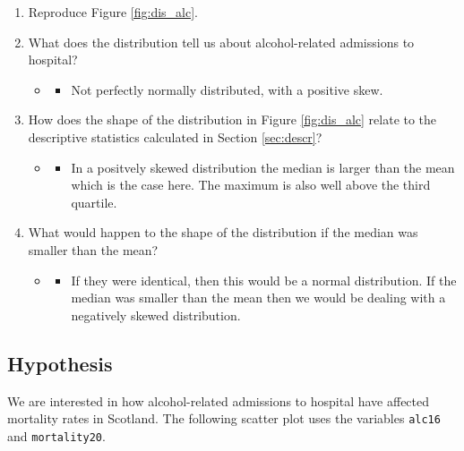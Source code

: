 \documentclass[12pt,a4paper]{article}
\providecommand{\tightlist}{%
  \setlength{\itemsep}{0pt}\setlength{\parskip}{0pt}}
\begin{document}
\begin{enumerate}
\def\labelenumi{\arabic{enumi}.}
\tightlist
\item
  Reproduce Figure \ref{fig:dis_alc}.
\item
  What does the distribution tell us about alcohol-related admissions to
  hospital?

  \begin{itemize}
   \item[]\begin{itemize}
       \item \textcolor{waraubergine}{Not perfectly normally distributed, with a positive skew.}
   \end{itemize}
  \end{itemize}
\item
  How does the shape of the distribution in Figure \ref{fig:dis_alc}
  relate to the descriptive statistics calculated in Section
  \ref{sec:descr}?

  \begin{itemize}
   \item[]\begin{itemize}
       \item \textcolor{waraubergine}{In a positvely skewed distribution the median is larger than the mean which is the case here. The maximum is also well above the third quartile.}
   \end{itemize}
  \end{itemize}
\item
  What would happen to the shape of the distribution if the median was
  smaller than the mean?

  \begin{itemize}
   \item[]\begin{itemize}
       \item \textcolor{waraubergine}{If they were identical, then this would be a normal distribution. If the median was smaller than the mean then we would be dealing with a negatively skewed distribution.}
   \end{itemize}
  \end{itemize}
\end{enumerate}

\subsection{Hypothesis}\label{hypothesis}

We are interested in how alcohol-related admissions to hospital have
affected mortality rates in Scotland. The following scatter plot uses
the variables \texttt{alc16} and \texttt{mortality20}.
\end{document}
